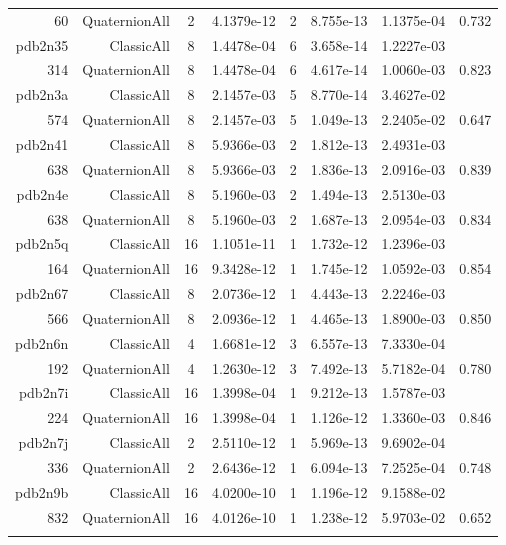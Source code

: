\begin{xltabular}{\textwidth}{r|rcS[table-format=1.4e+2]cS[table-format=1.3e+2]S[table-format=1.4e+2]S[table-format=-1.3]}
60 & QuaternionAll & 2 & 4.1379e-12 & 2 & 8.755e-13 & 1.1375e-04 & 0.732\\  \addlinespace
pdb2n35 & ClassicAll & 8 & 1.4478e-04 & 6 & 3.658e-14 & 1.2227e-03 & \\
314 & QuaternionAll & 8 & 1.4478e-04 & 6 & 4.617e-14 & 1.0060e-03 & 0.823\\  \addlinespace
{\color{red} pdb2n3a } & ClassicAll & 8 & 2.1457e-03 & 5 & 8.770e-14 & 3.4627e-02 & \\
574 & QuaternionAll & 8 & 2.1457e-03 & 5 & 1.049e-13 & 2.2405e-02 & 0.647\\  \addlinespace
pdb2n41 & ClassicAll & 8 & 5.9366e-03 & 2 & 1.812e-13 & 2.4931e-03 & \\
638 & QuaternionAll & 8 & 5.9366e-03 & 2 & 1.836e-13 & 2.0916e-03 & 0.839\\  \addlinespace
pdb2n4e & ClassicAll & 8 & 5.1960e-03 & 2 & 1.494e-13 & 2.5130e-03 & \\
638 & QuaternionAll & 8 & 5.1960e-03 & 2 & 1.687e-13 & 2.0954e-03 & 0.834\\  \addlinespace
pdb2n5q & ClassicAll & 16 & 1.1051e-11 & 1 & 1.732e-12 & 1.2396e-03 & \\
164 & QuaternionAll & 16 & 9.3428e-12 & 1 & 1.745e-12 & 1.0592e-03 & 0.854\\  \addlinespace
pdb2n67 & ClassicAll & 8 & 2.0736e-12 & 1 & 4.443e-13 & 2.2246e-03 & \\
566 & QuaternionAll & 8 & 2.0936e-12 & 1 & 4.465e-13 & 1.8900e-03 & 0.850\\  \addlinespace
pdb2n6n & ClassicAll & 4 & 1.6681e-12 & 3 & 6.557e-13 & 7.3330e-04 & \\
192 & QuaternionAll & 4 & 1.2630e-12 & 3 & 7.492e-13 & 5.7182e-04 & 0.780\\  \addlinespace
pdb2n7i & ClassicAll & 16 & 1.3998e-04 & 1 & 9.212e-13 & 1.5787e-03 & \\
224 & QuaternionAll & 16 & 1.3998e-04 & 1 & 1.126e-12 & 1.3360e-03 & 0.846\\  \addlinespace
pdb2n7j & ClassicAll & 2 & 2.5110e-12 & 1 & 5.969e-13 & 9.6902e-04 & \\
336 & QuaternionAll & 2 & 2.6436e-12 & 1 & 6.094e-13 & 7.2525e-04 & 0.748\\  \addlinespace
{\color{red} pdb2n9b } & ClassicAll & 16 & 4.0200e-10 & 1 & 1.196e-12 & 9.1588e-02 & \\
832 & QuaternionAll & 16 & 4.0126e-10 & 1 & 1.238e-12 & 5.9703e-02 & 0.652\\  \addlinespace

\end{xltabular}
